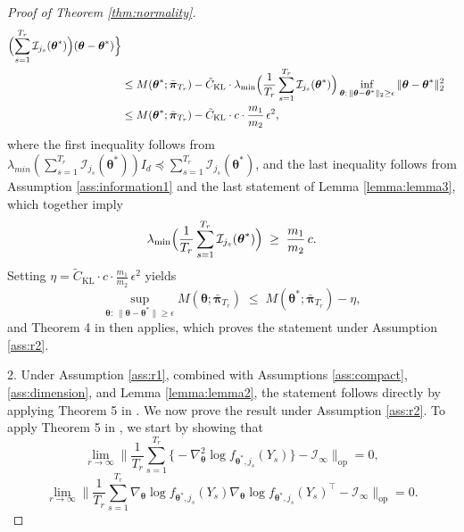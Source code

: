 \documentclass[12pt]{article}
\newcommand{\bfpi}{\boldsymbol{\pi}}
\newcommand{\bftheta}{\boldsymbol{\theta}}
\begin{document}
\begin{proof}[Proof of Theorem \ref{thm:normality}]
\begin{align*}
\Bigl(\sum_{s=1}^{T_r} \mathcal{I}_{j_s}(\bftheta^{\ast})\Bigr)
(\bftheta - \bftheta^{\ast})
\Bigr\} 
\\&\le
M(\bftheta^{\ast}; \bar{\bfpi}_{T_r})
- \tilde{C}_{\mathrm{KL}} \cdot 
\lambda_{\min} \Bigl(
\frac{1}{T_r} \sum_{s=1}^{T_r} \mathcal{I}_{j_s}(\bftheta^{\ast})
\Bigr)
\inf_{\bftheta:\,\|\bftheta - \bftheta^{\ast}\|_2 \ge \epsilon}
\|\bftheta - \bftheta^{\ast}\|_2^2 
\\&\le
M(\bftheta^{\ast}; \bar{\bfpi}_{T_r})
- \tilde{C}_{\mathrm{KL}} \cdot c \cdot \frac{m_1}{m_2}\,\epsilon^2,
\end{align*}
where the first inequality follows from $\lambda_{min}(\sum_{s=1}^{T_r} \mathcal{I}_{j_s}(\bftheta^{\ast})) I_d \preceq \sum_{s=1}^{T_r} \mathcal{I}_{j_s}(\bftheta^{\ast})$, and the last inequality follows from Assumption \ref{ass:information1} and the last
statement of Lemma \ref{lemma:lemma3}, which together imply
\begin{equation*}
\lambda_{\min} \Bigl(
\frac{1}{T_r} \sum_{s=1}^{T_r} \mathcal{I}_{j_s}(\bftheta^{\ast})
\Bigr)
\;\ge\;
\frac{m_1}{m_2}\,c.
\end{equation*}
Setting $\eta = \tilde{C}_{\mathrm{KL}} \cdot c \cdot \frac{m_1}{m_2}\,\epsilon^2$ yields
\begin{equation*}
\sup_{\bftheta:\,\|\bftheta - \bftheta^{\ast}\| \ge \epsilon}
M(\bftheta; \bar{\bfpi}_{T_r})
\;\le\;
M(\bftheta^{\ast}; \bar{\bfpi}_{T_r}) - \eta,
\end{equation*}
and Theorem 4 in  then applies, which proves the statement under Assumption \ref{ass:r2}.


2. Under Assumption \ref{ass:r1}, combined with Assumptions \ref{ass:compact}, \ref{ass:dimension}, and Lemma \ref{lemma:lemma2}, the statement follows directly
by applying Theorem 5 in . We now prove the result under Assumption \ref{ass:r2}. To apply Theorem 5 in , we start by showing that
\begin{equation} \label{e:target1}
\lim_{r \to \infty}
\Big\|
\frac{1}{T_r} \sum_{s=1}^{T_r}
\bigl\{-\nabla_{\bftheta}^2 \log f_{\bftheta^{\ast}, j_s}(Y_{s})\bigr\}
- \mathcal{I}_{\infty}
\Big\|_{\mathrm{op}}
= 0,
\end{equation}
\begin{equation} \label{e:target2}
\lim_{r \to \infty}
\Big\|
\frac{1}{T_r} \sum_{s=1}^{T_r}
\nabla_{\bftheta} \log f_{\bftheta^{\ast}, j_s}(Y_{s})
\nabla_{\bftheta} \log f_{\bftheta^{\ast}, j_s}(Y_s)^\top
- \mathcal{I}_{\infty}
\Big\|_{\mathrm{op}}
= 0.
\end{equation}


\end{proof}
\end{document}
